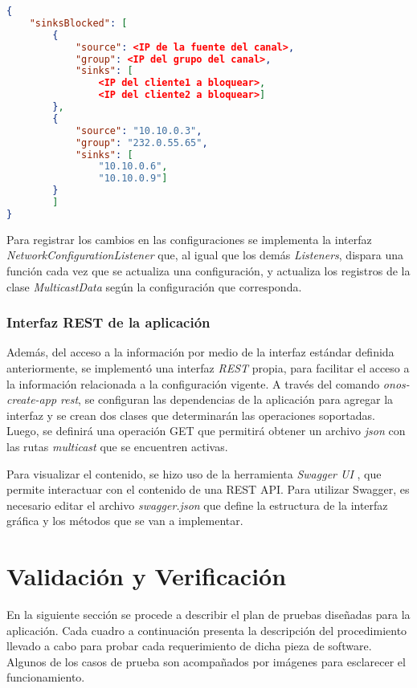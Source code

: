 \begin{lstlisting}[language=json, caption={Ejemplo de configuración del bloqueo de suscriptores}, captionpos=b, label={lst:blocksink}]
{
    "sinksBlocked": [
        {
            "source": <IP de la fuente del canal>,
            "group": <IP del grupo del canal>, 
            "sinks": [
                <IP del cliente1 a bloquear>,
                <IP del cliente2 a bloquear>]
        },
        {
            "source": "10.10.0.3",
            "group": "232.0.55.65",
            "sinks": [
                "10.10.0.6",
                "10.10.0.9"]
        }
        ]
}
\end{lstlisting}


Para registrar los cambios en las configuraciones se implementa la interfaz \textit{NetworkConfigurationListener} que, al igual que los demás \textit{Listeners}, dispara una función cada vez que se actualiza una configuración, y actualiza los registros de la clase \textit{MulticastData} según la configuración que corresponda.

\subsubsection*{Interfaz REST de la aplicación}
Además, del acceso a la información por medio de la interfaz estándar definida anteriormente, se implementó una interfaz \textit{REST} propia, para facilitar el acceso a la información relacionada a la configuración vigente. A través del comando \textit{onos-create-app rest}, se configuran las dependencias de la aplicación para agregar la interfaz y se crean dos clases que determinarán las operaciones soportadas. Luego, se definirá una operación GET que permitirá obtener un archivo \textit{json} con las rutas \textit{multicast} que se encuentren activas.


Para visualizar el contenido, se hizo uso de la herramienta \textit{Swagger UI} \parencite{swagger}, que permite interactuar con el contenido de una REST API. Para utilizar Swagger, es necesario editar el archivo \textit{swagger.json} que define la estructura de la interfaz gráfica y los métodos que se van a implementar.

\section{Validación y Verificación}

En la siguiente sección se procede a describir el plan de pruebas diseñadas para la aplicación. Cada cuadro a continuación presenta la descripción del procedimiento llevado a cabo para probar cada requerimiento de dicha pieza de software. Algunos de los casos de prueba son acompañados por imágenes para esclarecer el funcionamiento.

